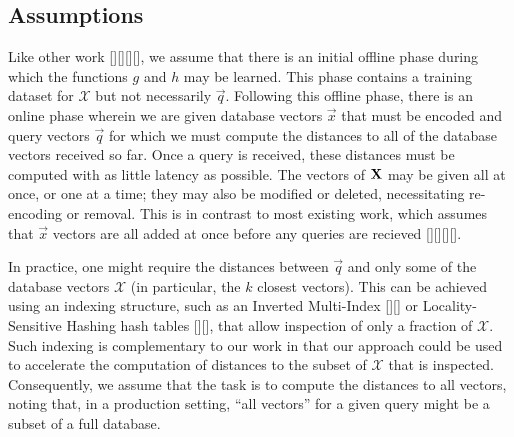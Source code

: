 



\subsection{Assumptions}

Like other work [][][][], we assume that there is an initial offline phase during which the functions $g$ and $h$ may be learned. This phase contains a training dataset for $\mathcal{X}$ but not necessarily $\vec{q}$. Following this offline phase, there is an online phase wherein we are given database vectors $\vec{x}$ that must be encoded and query vectors $\vec{q}$ for which we must compute the distances to all of the database vectors received so far. Once a query is received, these distances must be computed with as little latency as possible. The vectors of $\mathbf{X}$ may be given all at once, or one at a time; they may also be modified or deleted, necessitating re-encoding or removal. This is in contrast to most existing work, which assumes that $\vec{x}$ vectors are all added at once before any queries are recieved [][][][].

In practice, one might require the distances between $\vec{q}$ and only some of the database vectors $\mathcal{X}$ (in particular, the $k$ closest vectors). This can be achieved using an indexing structure, such as an Inverted Multi-Index [][] or Locality-Sensitive Hashing hash tables [][], that allow inspection of only a fraction of $\mathcal{X}$. Such indexing is complementary to our work in that our approach could be used to accelerate the computation of distances to the subset of $\mathcal{X}$ that is inspected. Consequently, we assume that the task is to compute the distances to all vectors, noting that, in a production setting, ``all vectors'' for a given query might be a subset of a full database.

